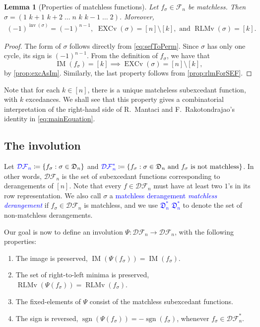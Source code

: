 \documentclass[reqno]{amsart}
\newtheorem{lemma}[theorem]{Lemma}
\theoremstyle{definition}
\newcommand{\defin}[1]{%
\relax\ifmmode%
\textcolor{blue}{#1}%
\else\textcolor{blue}{\emph{#1}}%
\fi%
}
\newcommand{\dArr}{\mathfrak{D}}
\newcommand{\SEF}{\mathcal{F}}  %
\newcommand{\DSEF}{\mathcal{DF}}%
\newcommand{\fretherD}{\Psi}
\DeclareMathOperator{\inv}{inv}
\DeclareMathOperator{\sgn}{sgn}
\DeclareMathOperator{\EXCv}{EXCv}
\DeclareMathOperator{\RLMv}{RLMv}
\DeclareMathOperator{\supp}{IM}
\begin{document}
\begin{lemma}[Properties of matchless functions]\label{lem:propertiesOfMatchless}
Let $f_{\sigma} \in \SEF_n$ be matchless.
Then $\sigma =(1\,\,k{+}1\,\,k{+}2 \; \dotsc\; n\,\,k\,\,k{-}1 \; \dotsc \; 2)$. Moreover,
 \begin{align*}
 (-1)^{\inv(\sigma)} = (-1)^{n-1}, \,\,
\EXCv(\sigma) = [n]\setminus [k],\text{ and } 
\RLMv(\sigma) = [k].
\end{align*}
\end{lemma}
\begin{proof}
The form of $\sigma$ follows directly from \eqref{eq:sefToPerm}.
Since $\sigma$ has only one cycle, its sign is $(-1)^{n-1}$. From the definition of $f_{\sigma}$, we have that
\[
 \supp(f_{\sigma}) = [k] \implies \EXCv(\sigma) = [n]\setminus [k],
\]
by \cref{prop:excAsIm}. Similarly, the last property follows from 
\cref{prop:rlmForSEF}.
\end{proof}
Note that for each $k \in [n]$, there is a unique matcheless 
subexcedant function, with $k$ excedances.
We shall see that this property gives a combinatorial interpretation of the right-hand side of
R.~Mantaci and F.~Rakotondrajao's identity in \eqref{eq:mainEquation}.


\subsection{The involution}
Let $\defin{\DSEF_n} \coloneqq \{ f_{\sigma} : \sigma\in \dArr_n \}$
  and $\defin{\DSEF^*_n} \coloneqq \{ f_{\sigma} : \sigma\in \dArr_n 
 \text{ and } f_{\sigma} \text{ is not matchless}\}$.
In other words, $\DSEF_n$ is the set of subexcedant functions 
corresponding to derangements of $[n]$. Note that every $f \in \DSEF_n$ must have at least two $1$'s
in its row representation. We also call $\sigma$ a \defin{matchless derangement} if $f_{\sigma}\in\DSEF_n$ is matchless, and we use \defin{$\dArr^*_n$} to denote the set of non-matchless derangements.
%


Our goal is now to define an involution $\fretherD:\DSEF_n\longrightarrow \DSEF_n$, 
with the following properties:
\begin{enumerate}[label=(\roman*)]
\item 
	The image is preserved, $\supp(\fretherD(f_\sigma )) = \supp( f_\sigma )$.
\item 
	The set of right-to-left minima is preserved,
	$\RLMv( \fretherD(f_\sigma ) ) = \RLMv( f_\sigma )$.
\item 
	The fixed-elements of $\fretherD$ consist of the matchless subexcedant functions.
\item 
	The sign is reversed, $\sgn(\fretherD(f_\sigma )) = -\sgn( f_\sigma )$,
	whenever $f_\sigma \in \DSEF_n^*$.
\end{enumerate}
\end{document}
